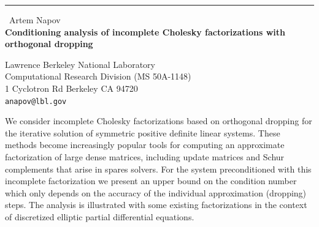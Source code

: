 \documentclass{report}
\begin{document}
\begin{center}
\rule{6in}{1pt} \
{\large Artem Napov \\
{\bf Conditioning analysis of incomplete Cholesky factorizations with orthogonal dropping}}

Lawrence Berkeley National Laboratory \\ Computational Research Division (MS 50A-1148) \\ 1 Cyclotron Rd Berkeley CA 94720
\\
{\tt anapov@lbl.gov}\end{center}

We consider incomplete Cholesky factorizations based on orthogonal
dropping for the iterative solution of symmetric positive definite linear
systems. These methods become increasingly popular tools for computing an
approximate factorization of large dense matrices, including update
matrices and Schur complements that arise in spares solvers. For the
system preconditioned with this incomplete factorization we present an
upper bound on the condition number which only depends on the accuracy of
the individual approximation (dropping) steps. The analysis is
illustrated with some existing factorizations in the context of
discretized elliptic partial differential equations.
\end{document}
